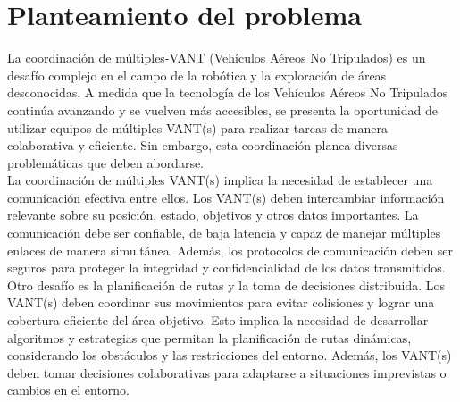 \documentclass[11pt,epsf,times]{article}
\begin{document}
\section*{Planteamiento del problema}



La coordinaci\'{o}n de m\'{u}ltiples-VANT (Veh\'{i}culos A\'{e}reos No Tripulados) es un desaf\'{i}o complejo en el campo de la rob\'{o}tica y la exploraci\'{o}n de \'{a}reas desconocidas. A medida que la tecnolog\'{i}a de los Veh\'{i}culos A\'{e}reos No Tripulados contin\'{u}a avanzando y se vuelven m\'{a}s accesibles, se presenta la oportunidad de utilizar equipos de m\'{u}ltiples VANT(s) para realizar tareas de manera colaborativa y eficiente. Sin embargo, esta coordinaci\'{o}n planea diversas problem\'{a}ticas que deben abordarse.\\

La coordinaci\'{o}n de m\'{u}ltiples VANT(s) implica la necesidad de establecer una comunicaci\'{o}n efectiva entre ellos. Los VANT(s) deben intercambiar informaci\'{o}n relevante sobre su posici\'{o}n, estado, objetivos y otros datos importantes. La comunicaci\'{o}n debe ser confiable, de baja latencia y capaz de manejar m\'{u}ltiples enlaces de manera simult\'{a}nea. Adem\'{a}s, los protocolos de comunicaci\'{o}n deben ser seguros para proteger la integridad y confidencialidad de los datos transmitidos.\\

Otro desaf\'{i}o es la planificaci\'{o}n de rutas y la toma de decisiones distribuida. Los VANT(s) deben coordinar sus movimientos para evitar colisiones y lograr una cobertura eficiente del \'{a}rea objetivo. Esto implica la necesidad de desarrollar algoritmos y estrategias que permitan la planificaci\'{o}n de rutas din\'{a}micas, considerando los obst\'{a}culos y las restricciones del entorno. Adem\'{a}s, los VANT(s) deben tomar decisiones colaborativas para adaptarse a situaciones imprevistas o cambios en el entorno.\\
\end{document}
